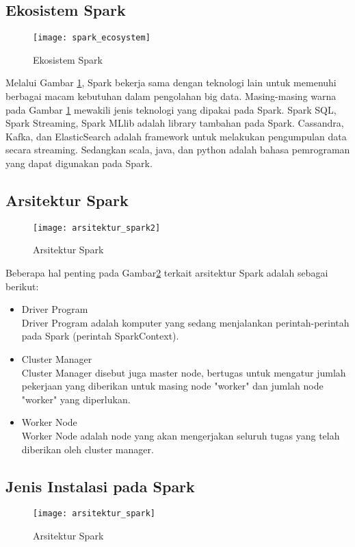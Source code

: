 \subsection{Ekosistem Spark}
\begin{figure}[H]
	\centering
	\texttt{[image: spark\_ecosystem]}
	\caption{Ekosistem Spark}
	\label{fig:spark_ecosystem}
\end{figure}
Melalui Gambar \ref{fig:spark_ecosystem}, Spark bekerja sama dengan teknologi lain untuk memenuhi berbagai macam kebutuhan dalam pengolahan big data. Masing-masing warna pada Gambar \ref{fig:spark_ecosystem} mewakili jenis teknologi yang dipakai pada Spark. Spark SQL, Spark Streaming, Spark MLlib adalah library tambahan pada Spark. Cassandra, Kafka, dan ElasticSearch adalah framework untuk melakukan pengumpulan data secara streaming. Sedangkan scala, java, dan python adalah bahasa pemrograman yang dapat digunakan pada Spark.

\subsection{Arsitektur Spark}
\begin{figure}[H]
	\centering
	\texttt{[image: arsitektur\_spark2]}
	\caption{Arsitektur Spark}
	\label{fig:arsitektur_spark2}
\end{figure}

\noindent Beberapa hal penting pada Gambar\ref{fig:arsitektur_spark2} terkait arsitektur Spark adalah sebagai berikut:

\begin{itemize}
\item Driver Program\\
Driver Program adalah komputer yang sedang menjalankan perintah-perintah pada Spark (perintah SparkContext). 
\item Cluster Manager\\
Cluster Manager disebut juga master node, bertugas untuk mengatur jumlah pekerjaan yang diberikan untuk masing node "worker" dan jumlah node "worker" yang diperlukan.
\item Worker Node\\
Worker Node adalah node yang akan mengerjakan seluruh tugas yang telah diberikan oleh cluster manager.
\end{itemize}


\subsection{Jenis Instalasi pada Spark}
\begin{figure}[H]
	\centering
	\texttt{[image: arsitektur\_spark]}
	\caption{Arsitektur Spark}
	\label{fig:arsitektur_spark}
\end{figure}

